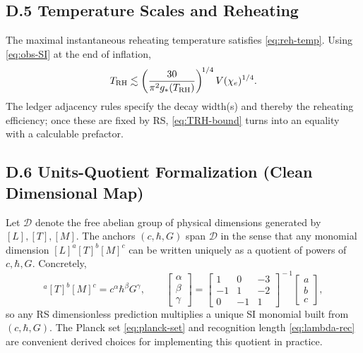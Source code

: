 \documentclass[11pt]{article}
\theoremstyle{definition}
\theoremstyle{remark}
\begin{document}
\subsection*{D.5 Temperature Scales and Reheating}
The maximal instantaneous reheating temperature satisfies \eqref{eq:reh-temp}. Using \eqref{eq:obs-SI} at the end of inflation,
\begin{equation}
T_{\rm RH}\lesssim\left(\frac{30}{\pi^2 g_*(T_{\rm RH})}\right)^{\!1/4}V(\chi_e)^{1/4}.
\label{eq:TRH-bound}
\end{equation}
The ledger adjacency rules specify the decay width(s) and thereby the reheating efficiency; once these are fixed by RS, \eqref{eq:TRH-bound} turns into an equality with a calculable prefactor.

\subsection*{D.6 Units-Quotient Formalization (Clean Dimensional Map)}
Let $\mathcal{D}$ denote the free abelian group of physical dimensions generated by $[L],[T],[M]$. The anchors $(c,\hbar,G)$ span $\mathcal{D}$ in the sense that any monomial dimension $[L]^a[T]^b[M]^c$ can be written uniquely as a quotient of powers of $c,\hbar,G$. Concretely,
\begin{equation}
[L]^a[T]^b[M]^c = c^{\alpha}\hbar^{\beta}G^{\gamma},
\qquad
\begin{bmatrix}
\alpha\\ \beta\\ \gamma
\end{bmatrix}
=
\begin{bmatrix}
1 & 0 & -3 \\
-1 & 1 & -2 \\
0 & -1 & 1
\end{bmatrix}^{\!-1}
\begin{bmatrix}
a\\ b\\ c
\end{bmatrix},
\label{eq:units-quotient}
\end{equation}
so any RS dimensionless prediction multiplies a unique SI monomial built from $(c,\hbar,G)$. The Planck set \eqref{eq:planck-set} and recognition length \eqref{eq:lambda-rec} are convenient derived choices for implementing this quotient in practice.
\end{document}
